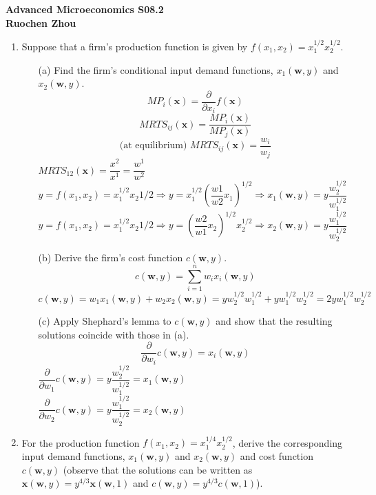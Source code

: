 \documentclass[11pt]{article}
\begin{document}
\begin{center}
\textbf{Advanced Microeconomics S08.2\\}
\textbf{Ruochen Zhou}
\end{center}

\medskip
\begin{enumerate}
\item Suppose that a firm's production function is given by $f(x_{1},x_{2})=x_{1}^{1/2}x_{2}^{1/2}$.
	\begin{itemize}
	\item[(a)] Find the firm's conditional input demand functions, $x_{1}(\mathbf{w},y)$ and $x_{2}(\mathbf{w},y)$.
	\medskip\\
	$$MP_i(\textbf{x})=\dfrac{\partial}{\partial x_i}f(\textbf{x})$$
	$$MRTS_{ij}(\textbf{x})=\dfrac{MP_i(\textbf{x})}{MP_j(\textbf{x})}$$
	$$\text{(at equilibrium) }MRTS_{ij}(\textbf{x})=\dfrac{w_i}{w_j}$$
	$MRTS_{12}(\textbf{x})=\dfrac{x^2}{x^1}=\dfrac{w^1}{w^2}$\\
	$y=f(x_1,x_2)=x_1^{1/2}x_2{1/2}\Rightarrow y=x_1^{1/2}(\dfrac{w1}{w2}x_1)^{1/2}\Rightarrow x_1(\textbf{w},y)=y\dfrac{w_2^{1/2}}{w_1^{1/2}}$\\
	$y=f(x_1,x_2)=x_1^{1/2}x_2{1/2}\Rightarrow y=(\dfrac{w2}{w1}x_2)^{1/2}x_2^{1/2}\Rightarrow x_2(\textbf{w},y)=y\dfrac{w_1^{1/2}}{w_2^{1/2}}$\\
	\item[(b)] Derive the firm's cost function $c(\mathbf{w},y)$.
	\medskip\\
	$$c(\textbf{w},y)=\sum_{i=1}^nw_ix_i(\textbf{w},y)$$
	$c(\textbf{w},y)=w_1x_1(\textbf{w},y)+w_2x_2(\textbf{w},y)=yw_2^{1/2}w_1^{1/2}+yw_1^{1/2}w_2^{1/2}=2yw_1^{1/2}w_2^{1/2}$
	\item[(c)] Apply Shephard's lemma to $c(\mathbf{w},y)$ and show that the resulting solutions coincide with those in (a).
	\medskip\\
	$$\dfrac{\partial}{\partial w_i}c(\textbf{w},y)=x_i(\textbf{w},y)$$
	$\dfrac{\partial}{\partial w_1}c(\textbf{w},y)=y\dfrac{w_2^{1/2}}{w_1^{1/2}}=x_1(\textbf{w},y)$\\
	$\dfrac{\partial}{\partial w_2}c(\textbf{w},y)=y\dfrac{w_1^{1/2}}{w_2^{1/2}}=x_2(\textbf{w},y)$\\
	\end{itemize}
\pagebreak
\item For the production function $f(x_{1},x_{2})=x_{1}^{1/4}x_{2}^{1/2}$, derive the corresponding input demand functions, $x_{1}(\mathbf{w},y)$ and $x_{2}(\mathbf{w},y)$ and cost function $c(\mathbf{w},y)$ (observe that the solutions can be written as $\mathbf{x}(\mathbf{w},y)=y^{4/3}\mathbf{x}(\mathbf{w},1)$ and $c(\mathbf{w},y)=y^{4/3}c(\mathbf{w},1)$).

\end{enumerate}
\end{document}
